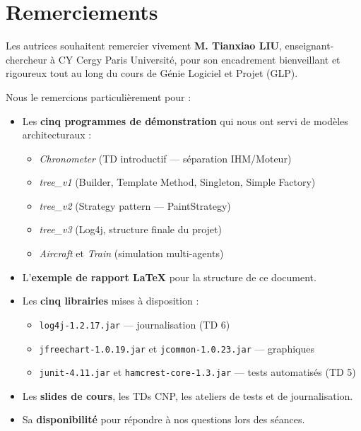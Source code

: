 \documentclass[11pt, french]{article}
\begin{document}

\tableofcontents
\listoffigures
\listoftables
\newpage

\section*{\color{bleucours}Remerciements}

Les autrices souhaitent remercier vivement \textbf{M. Tianxiao LIU}, enseignant-chercheur à CY Cergy Paris Université, pour son encadrement bienveillant et rigoureux tout au long du cours de Génie Logiciel et Projet (GLP).

Nous le remercions particulièrement pour :

\begin{itemize}
    \item Les \textbf{cinq programmes de démonstration} qui nous ont servi de modèles architecturaux :
    \begin{itemize}
        \item \textit{Chronometer} (TD introductif — séparation IHM/Moteur)
        \item \textit{tree\_v1} (Builder, Template Method, Singleton, Simple Factory)
        \item \textit{tree\_v2} (Strategy pattern — PaintStrategy)
        \item \textit{tree\_v3} (Log4j, structure finale du projet)
        \item \textit{Aircraft} et \textit{Train} (simulation multi-agents)
    \end{itemize}
    \item L'\textbf{exemple de rapport \LaTeX} pour la structure de ce document.
    \item Les \textbf{cinq librairies} mises à disposition :
    \begin{itemize}
        \item \texttt{log4j-1.2.17.jar} — journalisation (TD 6)
        \item \texttt{jfreechart-1.0.19.jar} et \texttt{jcommon-1.0.23.jar} — graphiques
        \item \texttt{junit-4.11.jar} et \texttt{hamcrest-core-1.3.jar} — tests automatisés (TD 5)
    \end{itemize}
    \item Les \textbf{slides de cours}, les TDs CNP, les ateliers de tests et de journalisation.
    \item Sa \textbf{disponibilité} pour répondre à nos questions lors des séances.
\end{itemize}








\newpage


\nocite{*}
\end{document}
